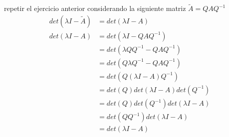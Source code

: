 repetir el ejercicio anterior considerando la siguiente matriz \(\tilde{A}=QAQ^{-1}\)
\[
    \begin{split}
        det( \lambda I-\tilde{A} ) & = det(\lambda I-A ) \\
        det( \lambda I-A ) & = det( \lambda I-QAQ^{-1} ) \\
        & = det( \lambda QQ^{-1}-QAQ^{-1} ) \\
        & = det( Q\lambda Q^{-1}-QAQ^{-1} ) \\
        & = det( Q( \lambda I-A )Q^{-1} ) \\
        & = det( Q) det( \lambda I-A ) det( Q^{-1} ) \\
        & = det( Q) det( Q^{-1} ) det( \lambda I-A ) \\
        & = det( QQ^{-1} ) det( \lambda I-A ) \\
        & = det( \lambda I-A )
    \end{split}
\]
